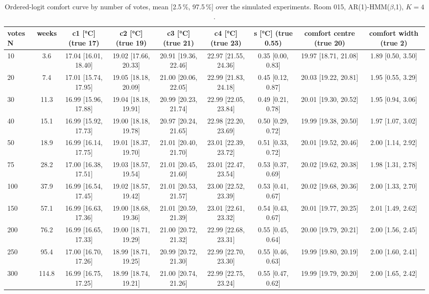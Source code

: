 \begin{table}[ht]
\centering
\begin{adjustbox}{max width=\textwidth}
\begin{tabular}{lcccccccc}
\hline
votes N & weeks & c1 [°C] (true 17) & c2 [°C] (true 19) & c3 [°C] (true 21) & c4 [°C] (true 23) & s [°C] (true 0.55) & comfort centre (true 20) & comfort width (true 2) \\
\hline
10 & 3.6 & 17.04 [16.01, 18.40] & 19.02 [17.66, 20.33] & 20.91 [19.36, 22.46] & 22.97 [21.55, 24.36] & 0.35 [0.00, 0.83] & 19.97 [18.71, 21.08] & 1.89 [0.50, 3.50] \\
20 & 7.4 & 17.01 [15.74, 17.95] & 19.05 [18.18, 20.09] & 21.00 [20.06, 22.05] & 22.99 [21.83, 24.18] & 0.45 [0.12, 0.87] & 20.03 [19.22, 20.81] & 1.95 [0.55, 3.29] \\
30 & 11.3 & 16.99 [15.96, 17.88] & 19.04 [18.18, 19.91] & 20.99 [20.23, 21.74] & 22.99 [22.05, 23.84] & 0.49 [0.21, 0.78] & 20.01 [19.30, 20.52] & 1.95 [0.94, 3.06] \\
40 & 15.1 & 16.99 [15.92, 17.73] & 19.00 [18.18, 19.78] & 20.97 [20.24, 21.65] & 22.98 [22.20, 23.69] & 0.50 [0.29, 0.72] & 19.99 [19.38, 20.50] & 1.97 [1.07, 3.02] \\
50 & 18.9 & 16.99 [16.14, 17.75] & 19.01 [18.37, 19.70] & 21.01 [20.40, 21.70] & 23.01 [22.39, 23.72] & 0.51 [0.33, 0.72] & 20.01 [19.52, 20.46] & 2.00 [1.14, 2.92] \\
75 & 28.2 & 17.00 [16.38, 17.51] & 19.03 [18.57, 19.54] & 21.01 [20.45, 21.60] & 23.01 [22.47, 23.54] & 0.53 [0.37, 0.69] & 20.02 [19.62, 20.38] & 1.98 [1.31, 2.78] \\
100 & 37.9 & 16.99 [16.54, 17.45] & 19.02 [18.57, 19.42] & 21.01 [20.53, 21.57] & 23.00 [22.52, 23.39] & 0.53 [0.41, 0.67] & 20.02 [19.68, 20.36] & 2.00 [1.33, 2.70] \\
150 & 57.1 & 16.99 [16.63, 17.36] & 19.00 [18.68, 19.36] & 21.01 [20.59, 21.39] & 23.01 [22.61, 23.32] & 0.54 [0.43, 0.67] & 20.01 [19.77, 20.25] & 2.01 [1.49, 2.62] \\
200 & 76.2 & 16.99 [16.65, 17.33] & 19.00 [18.71, 19.29] & 21.00 [20.72, 21.32] & 22.99 [22.68, 23.31] & 0.55 [0.45, 0.64] & 20.00 [19.79, 20.21] & 2.00 [1.56, 2.45] \\
250 & 95.4 & 17.00 [16.70, 17.26] & 18.99 [18.71, 19.25] & 20.99 [20.72, 21.30] & 22.99 [22.70, 23.30] & 0.55 [0.46, 0.63] & 19.99 [19.80, 20.19] & 2.00 [1.60, 2.41] \\
300 & 114.8 & 16.99 [16.75, 17.25] & 18.99 [18.74, 19.21] & 21.00 [20.74, 21.26] & 22.99 [22.75, 23.24] & 0.55 [0.47, 0.62] & 19.99 [19.79, 20.20] & 2.00 [1.65, 2.42] \\
\hline
\end{tabular}
\end{adjustbox}
\caption{Ordered-logit comfort curve by number of votes, mean [2.5\,\%, 97.5\,\%] over the simulated experiments. Room 015, AR(1)-HMM($\beta$,1), $K=4$.}
\label{tab:feedback_comfort_room_015_ar1_hmm_beta_1_K4}
\end{table}
